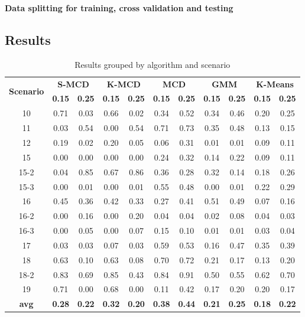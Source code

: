 \documentclass[review]{elsarticle}
\begin{document}
\textbf{Data splitting for training, cross validation and testing}


\subsection{Results}
\label{sec:results}

\begin{table}[h!]
  \centering
  \scriptsize
  \caption{Results grouped by algorithm and scenario}
  \label{tab:tab02}
  \begin{tabular}{ c|c c|c c|c c|c c|c c }
	\toprule
	\multirow{2}{*}{\textbf{Scenario}}   &\multicolumn{2}{c}{\textbf{S-MCD}} &\multicolumn{2}{c}{\textbf{K-MCD}} &\multicolumn{2}{c}{\textbf{MCD}} &\multicolumn{2}{c}{\textbf{GMM}} &\multicolumn{2}{c}{\textbf{K-Means}}\\ 
			\hhline{~----------}
			&\textbf{0.15} &\textbf{0.25} &\textbf{0.15} &\textbf{0.25} &\textbf{0.15} &\textbf{0.25} &\textbf{0.15} &\textbf{0.25} &\textbf{0.15} &\textbf{0.25}\\
	\midrule
		10 &\color{red} 0.71 & 0.03 & 0.66 & 0.02 & 0.34 & 0.52 & 0.34 & 0.46 & 0.20 & 0.25 \\ \hline
		11 & 0.03 & 0.54 & 0.00 & 0.54 & 0.71 &\color{red} 0.73 & 0.35 & 0.48 & 0.13 & 0.15 \\ \hline
		12 & 0.19 & 0.02 & 0.20 & 0.05 & 0.06 &\color{red} 0.31 & 0.01 & 0.01 & 0.09 & 0.11 \\ \hline
		15 & 0.00 & 0.00 & 0.00 & 0.00 & 0.24 &\color{red} 0.32 & 0.14 & 0.22 & 0.09 & 0.11 \\ \hline
		15-2 & 0.04 & 0.85 & 0.67 &\color{red} 0.86 & 0.36 & 0.28 & 0.32 & 0.14 & 0.18 & 0.26 \\ \hline
		15-3 & 0.00 & 0.01 & 0.00 & 0.01 &\color{red} 0.55 & 0.48 & 0.00 & 0.01 & 0.22 & 0.29 \\ \hline
		16 & 0.45 & 0.36 & 0.42 & 0.33 & 0.27 & 0.41 &\color{red} 0.51 & 0.49 & 0.07 & 0.16 \\ \hline
		16-2 & 0.00 & 0.16 & 0.00 &\color{red} 0.20 & 0.04 & 0.04 & 0.02 & 0.08 & 0.04 & 0.03 \\ \hline
		16-3 & 0.00 & 0.05 & 0.00 & 0.07 &\color{red} 0.15 & 0.10 & 0.01 & 0.01 & 0.03 & 0.04 \\ \hline
		17 & 0.03 & 0.03 & 0.07 & 0.03 &\color{red} 0.59 & 0.53 & 0.16 & 0.47 & 0.35 & 0.39 \\ \hline
		18 & 0.63 & 0.10 & 0.63 & 0.08 & 0.70 &\color{red} 0.72 & 0.21 & 0.17 & 0.13 & 0.20 \\ \hline
		18-2 & 0.83 & 0.69 & 0.85 & 0.43 & 0.84 &\color{red} 0.91 & 0.50 & 0.55 & 0.62 & 0.70 \\ \hline
		19 &\color{red} 0.71 & 0.00 & 0.68 & 0.00 & 0.11 & 0.42 & 0.17 & 0.20 & 0.20 & 0.17 \\ \hline
		\rowcolor{Gray} \textbf{avg} & \textbf{0.28} & \textbf{0.22} & \textbf{0.32} & \textbf{0.20} & \textbf{0.38} &\color{red} \textbf{0.44} & \textbf{0.21} & \textbf{0.25} & \textbf{0.18} & \textbf{0.22} \\ 
    \bottomrule
  \end{tabular}
\end{table}
\end{document}
